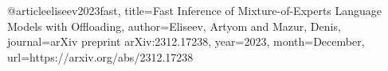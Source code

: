 @article{eliseev2023fast,
  title={Fast Inference of Mixture-of-Experts Language Models with Offloading},
  author={Eliseev, Artyom and Mazur, Denis},
  journal={arXiv preprint arXiv:2312.17238},
  year={2023},
  month={December},
  url={https://arxiv.org/abs/2312.17238}
}
